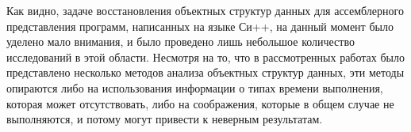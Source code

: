 Как видно, задаче восстановления объектных структур данных для ассемблерного представления программ, написанных на языке Си++, на данный момент было уделено мало внимания, и было проведено лишь небольшое количество исследований в этой области. Несмотря на то, что в рассмотренных работах было представлено несколько методов анализа объектных структур данных, эти методы опираются либо на использования информации о типах времени выполнения, которая может отсутствовать, либо на соображения, которые в общем случае не выполняются, и потому могут привести к неверным результатам.



























